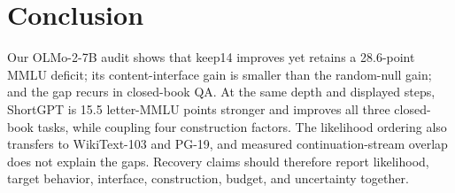 \section{Conclusion}
\label{sec:conclusion}

Our OLMo-2-7B audit shows that keep14 improves yet retains a 28.6-point MMLU
deficit; its content-interface gain is smaller than the random-null gain; and
the gap recurs in closed-book QA. At the same depth and displayed steps,
ShortGPT is 15.5 letter-MMLU points stronger and improves all three closed-book
tasks, while coupling four construction factors. The likelihood ordering also
transfers to WikiText-103 and PG-19, and measured continuation-stream overlap
does not explain the gaps. Recovery claims should therefore report likelihood,
target behavior, interface, construction, budget, and uncertainty together.
